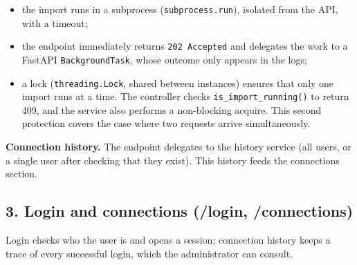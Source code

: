 \documentclass[
  french,
  11pt,
  a4paper,
]{report}
\providecommand{\tightlist}{%
  \setlength{\itemsep}{0pt}\setlength{\parskip}{0pt}}
\begin{document}
\begin{itemize}
\tightlist
\item
  the import runs in a subprocess (\texttt{subprocess.run}), isolated
  from the API, with a timeout;
\item
  the endpoint immediately returns \texttt{202\ Accepted} and delegates
  the work to a FastAPI \texttt{BackgroundTask}, whose outcome only
  appears in the logs;
\item
  a lock (\texttt{threading.Lock}, shared between instances) ensures
  that only one import runs at a time. The controller checks
  \texttt{is\_import\_running()} to return 409, and the service also
  performs a non-blocking acquire. This second protection covers the
  case where two requests arrive simultaneously.
\end{itemize}

\textbf{Connection history.} The endpoint delegates to the history
service (all users, or a single user after checking that they exist).
This history feeds the connections section.

\subsection{3. Login and connections (/login,
/connections)}\label{login-and-connections-login-connections}

Login checks who the user is and opens a session; connection history
keeps a trace of every successful login, which the administrator can
consult.
\end{document}
